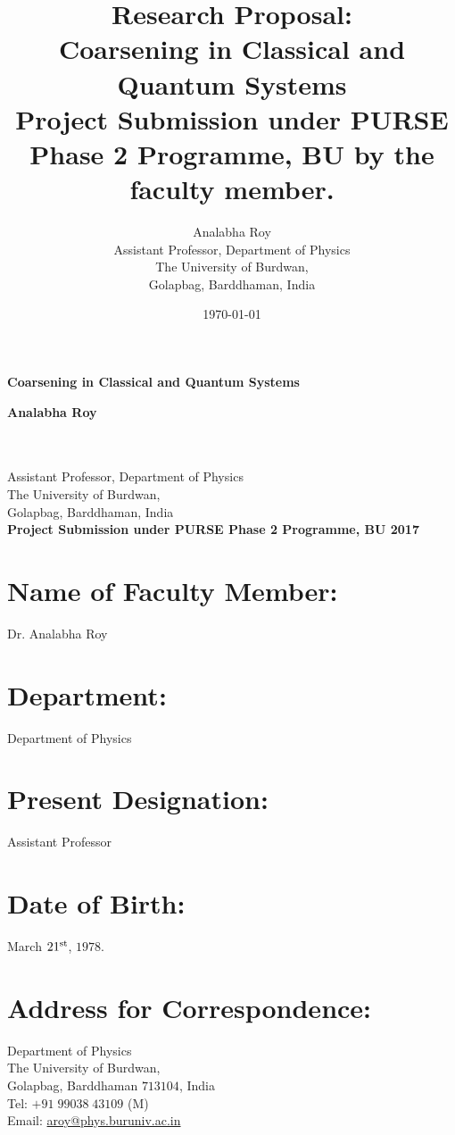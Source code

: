 \documentclass[a4paper,11pt,color]{article}
\title{Research Proposal:\\Coarsening in Classical and Quantum Systems\\
 Project Submission under PURSE Phase 2 Programme, BU 
 by the faculty member.
 }
\author{Analabha Roy\\Assistant Professor, Department of Physics\\ The University of Burdwan,\\ Golapbag, Barddhaman, India}
\date{\today}
\def\Acronimo{CCQS}
\begin{document}

\phantom{a}
\vspace{15mm}
\begin{center}


        \Large{
      
     
        \textbf{Coarsening in Classical and Quantum Systems}
           

          \vspace{1.15cm}
          
          \textbf{Analabha Roy\\\hfill\\\hfill\\}
          

Assistant Professor, Department of Physics\\ The University of Burdwan,\\ Golapbag, Barddhaman, India\\
          \vspace*{4cm}
          \textbf{Project Submission under PURSE Phase 2 Programme, BU 2017}
                             
     

        }

  \end{center}
\vspace{1cm}
\newpage 

\section{Name of Faculty Member:}
Dr. Analabha Roy
\section{Department:}
Department of Physics
\section{Present Designation:}
Assistant Professor
\section{Date of Birth:}
March $21^{\rm st}$, $1978$.
\section{Address for Correspondence:}
Department of Physics\\ 
The University of Burdwan,\\ 
Golapbag, Barddhaman $713104$, India\\
Tel: $+91\;99038\;43109$ (M)\\
Email: \url{aroy@phys.buruniv.ac.in}
\end{document}
